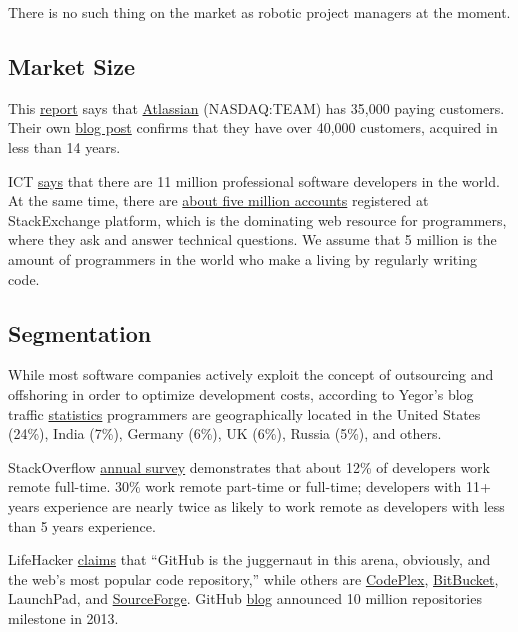 \documentclass{main}
\begin{document}
There is no such thing on the market as robotic project managers at the moment.

\subsection{Market Size}

This \href{www.capterra.com/project-management-software/#infographic}{report}
says that \href{https://www.atlassian.com/}{Atlassian}
(NASDAQ:TEAM) has 35,000 paying customers. Their
own \href{https://blogs.atlassian.com/2014/11/atlassian-customers-thank-you/}{blog post}
confirms that they have over 40,000 customers, acquired in less
than 14 years.

ICT \href{https://www.infoq.com/news/2014/01/IDC-software-developers}{says}
that there are 11 million professional software developers in the
world. At the same time, there are \href{https://sostats.github.io/}{about five million accounts} registered at
StackExchange platform, which is the dominating web resource for programmers,
where they ask and answer technical questions. We assume that 5 million is the
amount of programmers in the world who make a living by regularly writing code.

\subsection{Segmentation}

While most software companies actively exploit the concept of outsourcing and
offshoring in order to optimize development costs, according to Yegor's blog
traffic \href{https://twitter.com/yegor256/status/770780702711226369}{statistics}
programmers are geographically located in the United States
(24\%), India (7\%), Germany (6\%), UK (6\%), Russia (5\%), and others.

StackOverflow \href{https://stackoverflow.com/research/developer-survey-2016}{annual survey}
demonstrates that about 12\% of developers  work
remote full-time. 30\% work remote part-time or full-time; developers with 11+
years experience are nearly twice as likely to work remote as developers with
less than 5 years experience.

LifeHacker \href{https://lifehacker.com/the-best-alternatives-to-google-code-for-your-programmi-1691688947}{claims}
that ``GitHub is the juggernaut in this arena, obviously, and
the web's most popular code repository,'' while others are
\href{https://www.codeplex.com/}{CodePlex},
\href{https://bitbucket.org/}{BitBucket},
LaunchPad, and
\href{https://sourceforge.net/}{SourceForge}.
GitHub \href{https://github.com/blog/1724-10-million-repositories}{blog} announced 10 million repositories
milestone in 2013.
\end{document}
